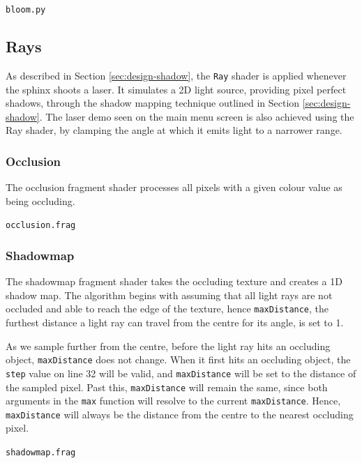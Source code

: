 \documentclass[../main/main.tex]{subfiles}
\begin{document}
\noindent\verb|bloom.py|


\subsection{Rays}
\label{sec:shader-rays}
As described in Section \ref{sec:design-shadow}, the \lstinline{Ray} shader is applied whenever the sphinx shoots a laser. It simulates a 2D light source, providing pixel perfect shadows, through the shadow mapping technique outlined in Section \ref{sec:design-shadow}. The laser demo seen on the main menu screen is also achieved using the Ray shader, by clamping the angle at which it emits light to a narrower range.

\subsubsection*{Occlusion}
The occlusion fragment shader processes all pixels with a given colour value as being occluding.

\noindent\verb|occlusion.frag|


\subsubsection*{Shadowmap}
The shadowmap fragment shader takes the occluding texture and creates a 1D shadow map. The algorithm begins with assuming that all light rays are not occluded and able to reach the edge of the texture, hence \lstinline{maxDistance}, the furthest distance a light ray can travel from the centre for its angle, is set to 1.

As we sample further from the centre, before the light ray hits an occluding object, \lstinline{maxDistance} does not change. When it first hits an occluding object, the \lstinline[morekeywords={step}]{step} value on line 32 will be valid, and \lstinline{maxDistance} will be set to the distance of the sampled pixel. Past this, \lstinline{maxDistance} will remain the same, since both arguments in the \lstinline{max} function will resolve to the current \lstinline{maxDistance}. Hence, \lstinline{maxDistance} will always be the distance from the centre to the nearest occluding pixel.

\noindent\verb|shadowmap.frag|

\end{document}
